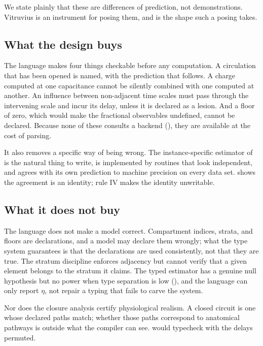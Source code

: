\documentclass[11pt,twocolumn,a4paper]{article}
\theoremstyle{thmstyle}
\theoremstyle{definition}
\theoremstyle{remark}
\begin{document}
We state plainly that these are differences of prediction, not demonstrations.
Vitruvius is an instrument for posing them, and  is the
shape such a posing takes.

\subsection{What the design buys}

The language makes four things checkable before any computation. A circulation
that has been opened is named, with the prediction that follows. A charge
computed at one capacitance cannot be silently combined with one computed at
another. An influence between non-adjacent time scales must pass through the
intervening scale and incur its delay, unless it is declared as a lesion. And
a floor of zero, which would make the fractional observables undefined, cannot
be declared. Because none of these consults a backend
(), they are available at the cost of parsing.

It also removes a specific way of being wrong. The instance-specific estimator
of  is the natural thing to write, is implemented by
routines that look independent, and agrees with its own prediction to machine
precision on every data set.  shows the agreement is an
identity; rule IV makes the identity unwritable.

\subsection{What it does not buy}

The language does not make a model correct. Compartment indices, strata, and
floors are declarations, and a model may declare them wrongly; what the type
system guarantees is that the declarations are used consistently, not that
they are true. The stratum discipline enforces adjacency but cannot verify
that a given element belongs to the stratum it claims. The typed estimator has
a genuine null hypothesis but no power when type separation is low
(), and the language can only report $\eta$, not repair
a typing that fails to carve the system.

Nor does the closure analysis certify physiological realism. A closed circuit
is one whose declared paths match; whether those paths correspond to
anatomical pathways is outside what the compiler can see. 
would typecheck with the delays permuted.
\end{document}
